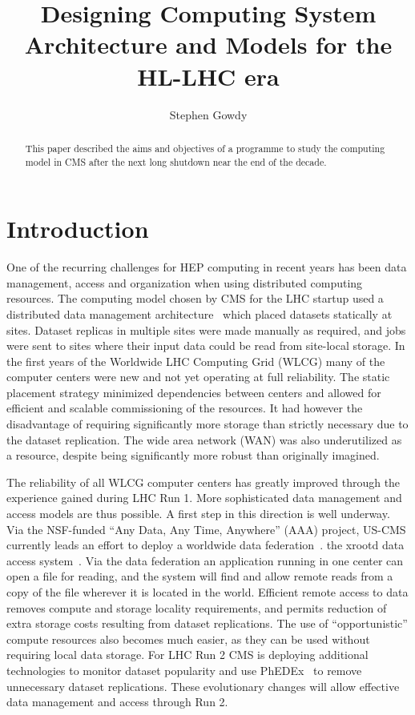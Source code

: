\documentclass[a4paper]{jpconf}
\begin{document}
\title{Designing Computing System Architecture and Models for the HL-LHC era}

\author{Stephen Gowdy}

\address{Fermilab, Batavia IL, USA}


\begin{abstract}
This paper described the aims and objectives of a programme to study
the computing model in CMS after the next long shutdown near the end
of the decade.
\end{abstract}

\section{Introduction}

One of the recurring challenges for HEP computing in recent years
has been data management, access and organization when using
distributed computing resources.  The computing model chosen by CMS
for the LHC startup used a distributed data management
architecture~\cite{CMSCTDR} which placed datasets statically at
sites. Dataset replicas in multiple sites were made manually as
required, and jobs were sent to sites where their input data could
be read from site-local storage.  In the first years of the Worldwide
LHC Computing Grid (WLCG) many of the computer centers were new and
not yet operating at full reliability. The static placement strategy
minimized dependencies between centers and allowed for efficient
and scalable commissioning of the resources.  It had however the
disadvantage of requiring significantly more storage than strictly
necessary due to the dataset replication. The wide area network
(WAN) was also underutilized as a resource, despite being significantly
more robust than originally imagined.

The reliability of all WLCG computer centers has greatly improved
through the experience gained during LHC Run 1. More sophisticated
data management and access models are thus possible. A first step
in this direction is well underway. Via the NSF-funded ``Any Data,
Any Time, Anywhere'' (AAA) project, US-CMS currently leads an effort
to deploy a worldwide data federation~\cite{AAACHEP13}.  %
the xrootd data access system~\cite{XROOTD1}.  Via the data federation
an application running in one center can open a file for reading,
and the system will find and allow remote reads from a copy of the
file wherever it is located in the world. Efficient remote access
to data removes compute and storage locality requirements, and
permits reduction of extra storage costs resulting from dataset
replications.  The use of ``opportunistic'' compute resources also
becomes much easier, as they can be used without requiring local
data storage.  For LHC Run 2 CMS is deploying additional technologies
to monitor dataset popularity and use PhEDEx~\cite{PHEDEX} to remove
unnecessary dataset replications. These evolutionary changes will
allow effective data management and access through Run 2.
\end{document}
